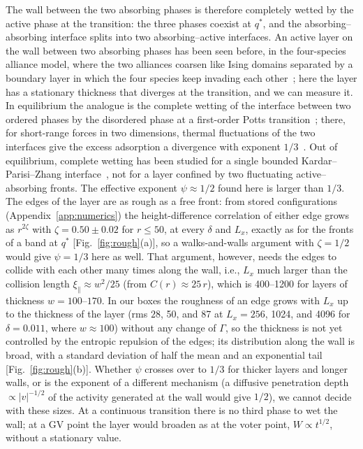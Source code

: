 \documentclass[pre,twocolumn,superscriptaddress,showpacs,floatfix]{revtex4-2}
\newcommand{\qs}{q^{*}}
\begin{document}
The wall between the two absorbing phases is therefore completely wetted by the active phase at
the transition: the three phases coexist at $\qs$, and the absorbing--absorbing interface splits
into two absorbing--active interfaces. An active layer on the wall between two absorbing phases
has been seen before, in the four-species alliance model, where the two alliances coarsen like
Ising domains separated by a boundary layer in which the four species keep invading each
other~\cite{szabo2007}; here the layer has a stationary thickness that diverges at the
transition, and we can measure it. In equilibrium the analogue is the complete wetting of the
interface between two ordered phases by the disordered phase at a first-order Potts
transition~\cite{selke1983,carlon1999}; there, for short-range forces in two dimensions, thermal
fluctuations of the two interfaces give the excess adsorption a divergence with exponent
$1/3$~\cite{lipowsky1983,fisher1984,carlon1999}. Out of equilibrium, complete wetting has been
studied for a single bounded Kardar--Parisi--Zhang
interface~\cite{hinrichsen1997wet,munoz1998,delossantos2003}, not for a layer confined by two
fluctuating active--absorbing fronts. The effective exponent $\psi\approx 1/2$ found here is
larger than $1/3$. The edges of the layer are as rough as a free front: from stored configurations
(Appendix~\ref{app:numerics}) the height-difference correlation of either edge grows as
$r^{2\zeta}$ with $\zeta = 0.50\pm0.02$ for $r\le 50$, at every $\delta$ and $L_x$, exactly as for
the fronts of a band at $\qs$ [Fig.~\ref{fig:rough}(a)], so a walks-and-walls argument with
$\zeta = 1/2$ would give $\psi = 1/3$ here as well. That argument, however, needs the edges to
collide with each other many times along the wall, i.e., $L_x$ much larger than the collision
length $\xi_\parallel\approx w^2/25$ (from $C(r)\approx 25\,r$), which is 400--1200 for layers of
thickness $w = 100$--$170$. In our boxes the roughness of an edge grows with $L_x$ up to the
thickness of the layer (rms $28$, 50, and 87 at $L_x = 256$, 1024, and 4096 for $\delta = 0.011$,
where $w\approx 100$) without any change of $\Gamma$, so the thickness is not yet controlled by
the entropic repulsion of the edges; its distribution along the wall is broad, with a standard
deviation of half the mean and an exponential tail [Fig.~\ref{fig:rough}(b)]. Whether $\psi$
crosses over to $1/3$ for thicker layers and longer walls, or is the exponent of a different
mechanism (a diffusive penetration depth $\propto|v|^{-1/2}$ of the activity generated at the
wall would give $1/2$), we cannot decide with these sizes. At a continuous transition there is no
third phase to wet the wall; at a GV point the layer would broaden as at the voter point,
$W\propto t^{1/2}$, without a stationary value.
\end{document}
